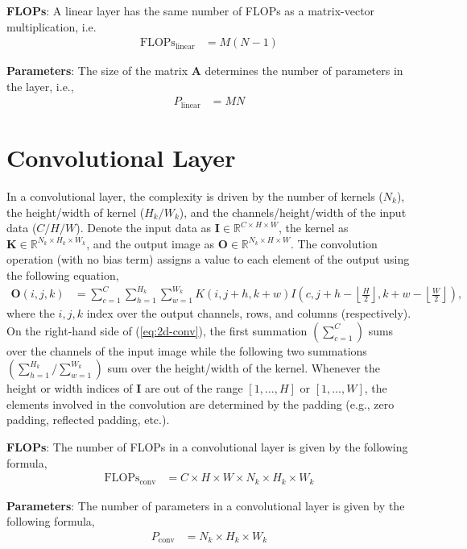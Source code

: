 \textbf{FLOPs}: A linear layer has the same number of FLOPs as a matrix-vector multiplication, i.e.
\begin{align*}
	\text{FLOPs}_{\text{linear}} &= M(N-1)
\end{align*}

\textbf{Parameters}: The size of the matrix $\mathbf{A}$ determines the number of parameters in the layer, i.e.,
\begin{align*}
	P_{\text{linear}} &= MN
\end{align*}

\section{Convolutional Layer}

In a convolutional layer, the complexity is driven by the number of kernels ($N_k$), the height/width of kernel ($H_k/W_k$), and the channels/height/width of the input data ($C/H/W$). Denote the input data as $\mathbf I\in\mathbb{R}^{C\times H\times W}$, the kernel as $\mathbf{K}\in\mathbb{R}^{N_k\times H_k\times W_k}$, and the output image as $\mathbf O\in\mathbb{R}^{N_k\times H\times W}$. The convolution operation (with no bias term) assigns a value to each element of the output using the following equation,
\begin{align}
	\mathbf{O}(i,j,k) &= \sum_{c=1}^{C}\sum_{h=1}^{H_k}\sum_{w=1}^{W_k} K(i,j+h,k+w)I\left(c,j+h-\left\lfloor\frac{H}{2}\right\rfloor,k+w-\left\lfloor\frac{W}{2}\right\rfloor\right), \label{eq:2d-conv}
\end{align}
where the $i,j,k$ index over the output channels, rows, and columns (respectively). On the right-hand side of (\ref{eq:2d-conv}), the first summation $\left(\sum_{c=1}^C\right)$ sums over the channels of the input image while the following two summations $\left(\sum_{h=1}^{H_k}/\sum_{w=1}^{W_k}\right)$ sum over the height/width of the kernel. Whenever the height or width indices of $\mathbf{I}$ are out of the range $[1,\dots,H]$ or $[1,\dots,W]$, the elements involved in the convolution are determined by the padding (e.g., zero padding, reflected padding, etc.).

\textbf{FLOPs}: The number of FLOPs in a convolutional layer is given by the following formula,
\begin{align*}
	\text{FLOPs}_{\text{conv}} &= C\times H \times W \times N_k \times H_k \times W_k
\end{align*}

\textbf{Parameters}: The number of parameters in a convolutional layer is given by the following formula,
\begin{align*}
	P_{\text{conv}} &= N_k\times H_k\times W_k
\end{align*}

